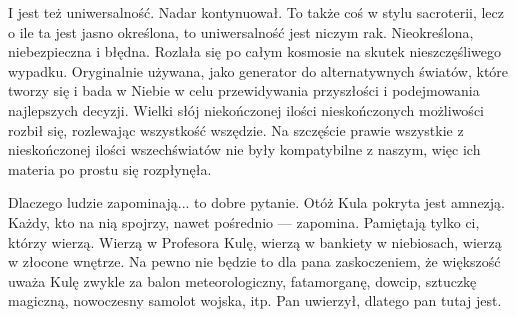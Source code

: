 \ds{} I jest też uniwersalność. \dm{} Nadar kontynuował. \dm{} To także coś w stylu sacroterii, lecz o ile ta jest jasno określona, to uniwersalność jest niczym rak.
Nieokreślona, niebezpieczna i błędna. Rozlała się po całym kosmosie na skutek nieszczęśliwego wypadku. 
Oryginalnie używana, jako generator do alternatywnych światów, które tworzy się i bada w Niebie w celu przewidywania przyszłości i podejmowania najlepszych decyzji. Wielki słój niekończonej ilości nieskończonych możliwości rozbił się, rozlewając wszystkość wszędzie. Na szczęście prawie wszystkie z nieskończonej ilości wszechświatów nie były kompatybilne z naszym, więc ich materia po prostu się rozpłynęła.








Dlaczego ludzie zapominają... to dobre pytanie.
Otóż Kula pokryta jest amnezją. Każdy, kto na nią spojrzy, nawet pośrednio --- zapomina.
Pamiętają tylko ci, którzy wierzą. Wierzą w Profesora Kulę, wierzą w bankiety w niebiosach, wierzą w złocone wnętrze.
Na pewno nie będzie to dla pana zaskoczeniem, że większość uważa Kulę zwykle za balon meteorologiczny, fatamorganę, dowcip, sztuczkę magiczną, nowoczesny samolot wojska, itp.
Pan uwierzył, dlatego pan tutaj jest.






